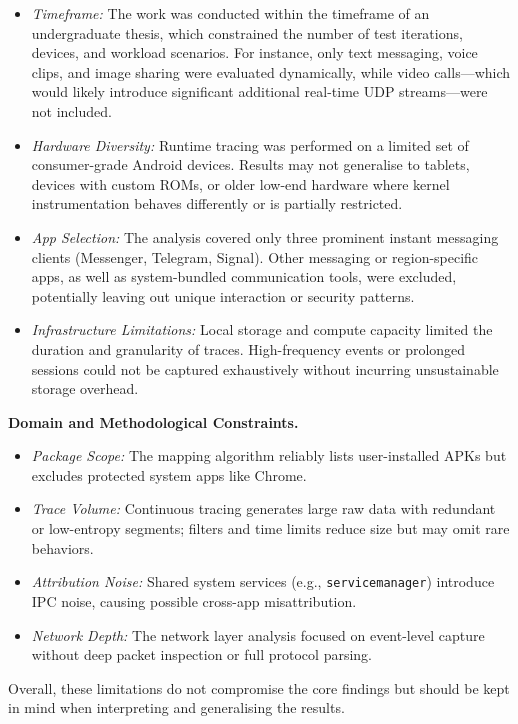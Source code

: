 \documentclass[a4paper,12pt]{report}
\begin{document}
\begin{itemize}
\item \textit{Timeframe:} The work was conducted within the timeframe of an undergraduate thesis, which constrained the number of test iterations, devices, and workload scenarios. For instance, only text messaging, voice clips, and image sharing were evaluated dynamically, while video calls—which would likely introduce significant additional real-time UDP streams—were not included.
\item \textit{Hardware Diversity:} Runtime tracing was performed on a limited set of consumer-grade Android devices. Results may not generalise to tablets, devices with custom ROMs, or older low-end hardware where kernel instrumentation behaves differently or is partially restricted.
\item \textit{App Selection:} The analysis covered only three prominent instant messaging clients (Messenger, Telegram, Signal). Other messaging or region-specific apps, as well as system-bundled communication tools, were excluded, potentially leaving out unique interaction or security patterns.
\item \textit{Infrastructure Limitations:} Local storage and compute capacity limited the duration and granularity of traces. High-frequency events or prolonged sessions could not be captured exhaustively without incurring unsustainable storage overhead.
\end{itemize}



\textbf{Domain and Methodological Constraints.}
\begin{itemize}
\item \textit{Package Scope:} The mapping algorithm reliably lists user-installed APKs but excludes protected system apps like Chrome.

\item \textit{Trace Volume:} Continuous tracing generates large raw data with redundant or low-entropy segments; filters and time limits reduce size but may omit rare behaviors.
\item \textit{Attribution Noise:} Shared system services (e.g., \texttt{servicemanager}) introduce IPC noise, causing possible cross-app misattribution.
\item \textit{Network Depth:} The network layer analysis focused on event-level capture without deep packet inspection or full protocol parsing.
\end{itemize}

Overall, these limitations do not compromise the core findings but should be kept in mind when interpreting and generalising the results.
\end{document}
